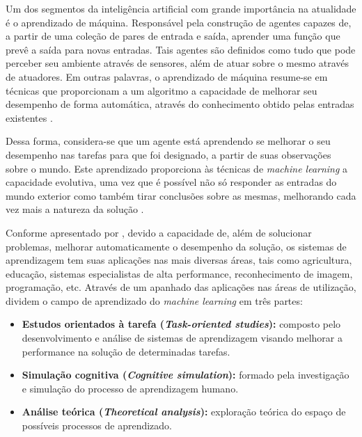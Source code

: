 \documentclass[12pt, openright, oneside, a4paper, brazil]{abntex2}
\begin{document}
Um dos segmentos da inteligência artificial com grande importância na atualidade é o aprendizado de máquina. Responsável pela construção de agentes capazes de, a partir de uma coleção de pares de entrada e saída, aprender uma função que prevê a saída para novas entradas. Tais agentes são definidos como tudo que pode perceber seu ambiente através de sensores, além de atuar sobre o mesmo através de atuadores. Em outras palavras, o aprendizado de máquina resume-se em técnicas que proporcionam a um algoritmo a capacidade de melhorar seu desempenho de forma automática, através do conhecimento obtido pelas entradas existentes \cite{coppin2015inteligencia}.

Dessa forma, considera-se que um agente está aprendendo se melhorar o seu desempenho nas tarefas para que foi designado, a partir de suas observações sobre o mundo. Este aprendizado proporciona às técnicas de \textit{machine learning} a capacidade evolutiva, uma vez que é possível não só responder as entradas do mundo exterior como também tirar conclusões sobre as mesmas, melhorando cada vez mais a natureza da solução \cite{russell2004inteligencia}.

Conforme apresentado por , devido a capacidade de, além de solucionar problemas, melhorar automaticamente o desempenho da solução, os sistemas de aprendizagem tem suas aplicações nas mais diversas áreas, tais como agricultura, educação, sistemas especialistas de alta performance, reconhecimento de imagem, programação, etc. Através de um apanhado das aplicações nas áreas de utilização,  dividem o campo de aprendizado do \textit{machine learning} em três partes:

\begin{itemize}

	\item \textbf{Estudos orientados à tarefa (\textit{Task-oriented studies}):} composto pelo desenvolvimento e análise de sistemas de aprendizagem visando melhorar a performance na solução de determinadas tarefas.

	\item \textbf{Simulação cognitiva (\textit{Cognitive simulation}):} formado pela investigação e simulação do processo de aprendizagem humano.

	\item \textbf{Análise teórica (\textit{Theoretical analysis}):} exploração teórica do espaço de possíveis processos de aprendizado.

\end{itemize}
\end{document}
